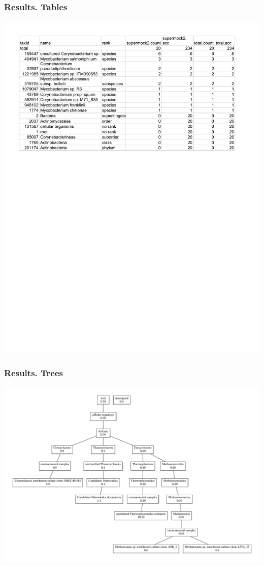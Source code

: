 \documentclass{beamer}
\begin{document}
\begin{frame}
\frametitle{Results. Tables}
\includegraphics[width=\textwidth]{table.pdf}
\end{frame}

\begin{frame}
\frametitle{Results. Trees}
\includegraphics[width=\textwidth]{tree.pdf}
\end{frame}
\end{document}
